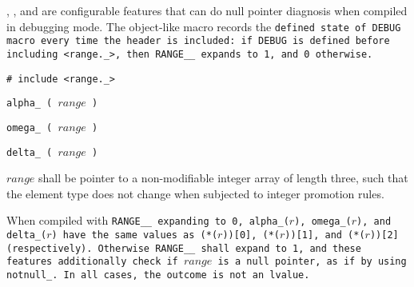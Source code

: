 , , and  are configurable features
that can do null pointer diagnosis when compiled in debugging mode.
The object-like macro  records the \tt{defined} state
of \tt{DEBUG} macro every time the header  is included:
if \tt{DEBUG} is defined before including \tt{<range._>},
then \tt{RANGE__} expands to \tt{1}, and \tt{0} otherwise.


\tt{# include <range._>}

\tt{alpha_ (} $range$ \tt{)}

\tt{omega_ (} $range$ \tt{)}

\tt{delta_ (} $range$ \tt{)}


$range$ shall be pointer to a non-modifiable integer array of length three, such
that the element type does not change when subjected to integer promotion rules.


When compiled with \tt{RANGE__} expanding to \tt{0}, \tt{alpha_(}$r$\tt{)},
\tt{omega_(}$r$\tt{)}, and \tt{delta_(}$r$\tt{)} have the same values as
\tt{(*(}$r$\tt{))[0]}, \tt{(*(}$r$\tt{))[1]}, and \tt{(*(}$r$\tt{))[2]} (respectively).
Otherwise \tt{RANGE__} shall expand to \tt{1}, and these features
additionally check if $range$ is a null pointer, as if by using \tt{notnull_}.
In all cases, the outcome is not an lvalue.
